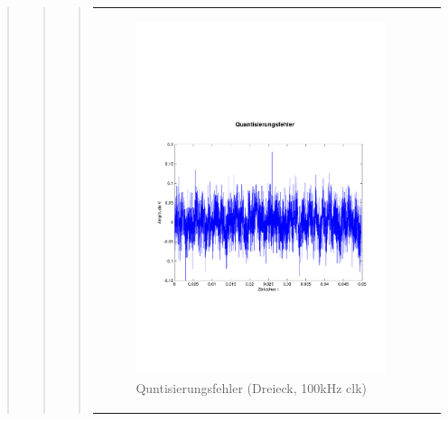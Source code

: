 \begin{quote}
\begin{quote}
\begin{quote}
            \begin{center}
                \begin{tabular}{ll}
                
                \hspace{-4cm}
                    
                    \begin{minipage}{0.55\textwidth}
                        \begin{figure}[H]
                            \includegraphics[scale=0.4, trim = 0.8cm 7cm 0.8cm
                            8.5cm, clip]
                            {./Bilder/drei100_Quantisierungsfehler}
                              \caption{Quntisierungsfehler (Dreieck, 100kHz clk)}
                        \end{figure}
                    \end{minipage}
                                  

\end{tabular}
\end{center}
\end{quote}
\end{quote}
\end{quote}
